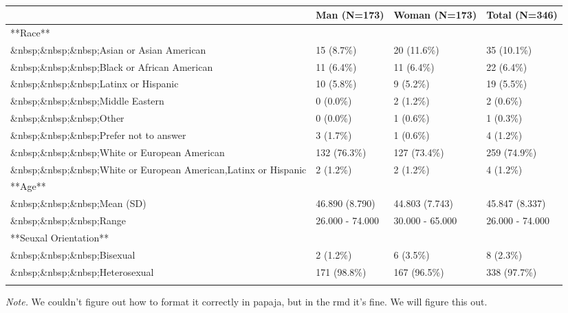 \documentclass[
  english,
  man]{apa6}
\begin{document}
\begin{table}[tbp]

\begin{center}
\begin{threeparttable}

\caption{\label{tab:unnamed-chunk-4}}

\scriptsize{

\begin{tabular}{llll}
\toprule
 & \multicolumn{1}{c}{Man (N=173)} & \multicolumn{1}{c}{Woman (N=173)} & \multicolumn{1}{c}{Total (N=346)}\\
\midrule
**Race** &  &  & \\
\&nbsp;\&nbsp;\&nbsp;Asian or Asian American & 15 (8.7\%) & 20 (11.6\%) & 35 (10.1\%)\\
\&nbsp;\&nbsp;\&nbsp;Black or African American & 11 (6.4\%) & 11 (6.4\%) & 22 (6.4\%)\\
\&nbsp;\&nbsp;\&nbsp;Latinx or Hispanic & 10 (5.8\%) & 9 (5.2\%) & 19 (5.5\%)\\
\&nbsp;\&nbsp;\&nbsp;Middle Eastern & 0 (0.0\%) & 2 (1.2\%) & 2 (0.6\%)\\
\&nbsp;\&nbsp;\&nbsp;Other & 0 (0.0\%) & 1 (0.6\%) & 1 (0.3\%)\\
\&nbsp;\&nbsp;\&nbsp;Prefer not to answer & 3 (1.7\%) & 1 (0.6\%) & 4 (1.2\%)\\
\&nbsp;\&nbsp;\&nbsp;White or European American & 132 (76.3\%) & 127 (73.4\%) & 259 (74.9\%)\\
\&nbsp;\&nbsp;\&nbsp;White or European American,Latinx or Hispanic & 2 (1.2\%) & 2 (1.2\%) & 4 (1.2\%)\\
**Age** &  &  & \\
\&nbsp;\&nbsp;\&nbsp;Mean (SD) & 46.890 (8.790) & 44.803 (7.743) & 45.847 (8.337)\\
\&nbsp;\&nbsp;\&nbsp;Range & 26.000 - 74.000 & 30.000 - 65.000 & 26.000 - 74.000\\
**Seuxal Orientation** &  &  & \\
\&nbsp;\&nbsp;\&nbsp;Bisexual & 2 (1.2\%) & 6 (3.5\%) & 8 (2.3\%)\\
\&nbsp;\&nbsp;\&nbsp;Heterosexual & 171 (98.8\%) & 167 (96.5\%) & 338 (97.7\%)\\
\bottomrule
\addlinespace
\end{tabular}

}

\begin{tablenotes}[para]
\normalsize{\textit{Note.} We couldn't figure out how to format it correctly in papaja, but in the rmd it's fine. We will figure this out.}
\end{tablenotes}

\end{threeparttable}
\end{center}

\end{table}
\end{document}
